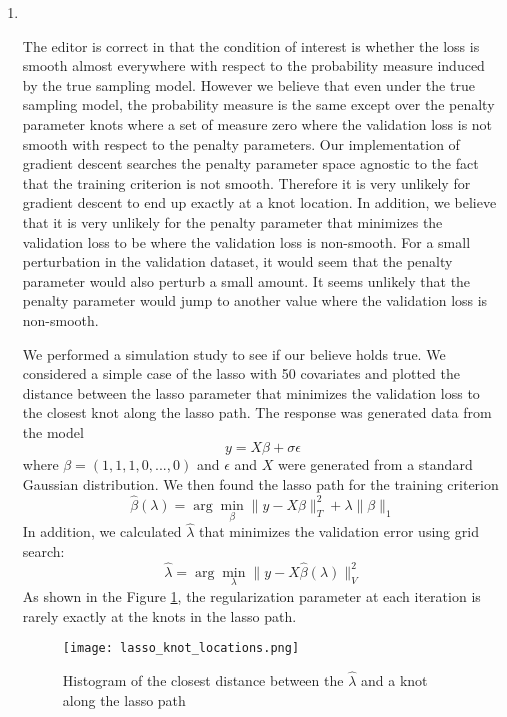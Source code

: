 \documentclass[]{article}
\newcommand{\reply}{\item[]\ }
\begin{document}
\begin{enumerate}
		\reply 
		
		The editor is correct in that the condition of interest is whether the loss is smooth almost everywhere with respect to the probability measure induced by the true sampling model. However we believe that even under the true sampling model, the probability measure is the same except over the penalty parameter knots where a set of measure zero where the validation loss is not smooth with respect to the penalty parameters. Our implementation of gradient descent searches the penalty parameter space agnostic to the fact that the training criterion is not smooth. Therefore it is very unlikely for gradient descent to end up exactly at a knot location. In addition, we believe that it is very unlikely for the penalty parameter that minimizes the validation loss to be where the validation loss is non-smooth. For a small perturbation in the validation dataset, it would seem that the penalty parameter would also perturb a small amount. It seems unlikely that the penalty parameter would jump to another value where the validation loss is non-smooth.
		
		We performed a simulation study to see if our believe holds true. We considered a simple case of the lasso with 50 covariates and plotted the distance between the lasso parameter that minimizes the validation loss to the closest knot along the lasso path. The response was generated data from the model
		$$
		y = X\beta + \sigma\epsilon
		$$
		where $\beta = (1, 1, 1, 0, ..., 0)$ and $\epsilon$ and $X$ were generated from a standard Gaussian distribution. We then found the lasso path for the training criterion
		$$
		\hat{\beta}(\lambda) = \arg\min_{\beta} \| y - X\beta \|_T^2 + \lambda \|\beta\|_1
		$$
		In addition, we calculated $\hat\lambda$ that minimizes the validation error using grid search:
		$$
		\hat{\lambda} = \arg\min_\lambda \| y - X\hat{\beta}(\lambda)\|_V^2
		$$
		As shown in the Figure \ref{fig:lasso}, the regularization parameter at each iteration is rarely exactly at the knots in the lasso path.
		
		\begin{figure}
			\label{fig:lasso}
			\caption{Histogram of the closest distance between the $\hat\lambda$ and a knot along the lasso path}
			\centering
			\texttt{[image: lasso\_knot\_locations.png]}
		\end{figure}
	\end{enumerate}
\end{document}
